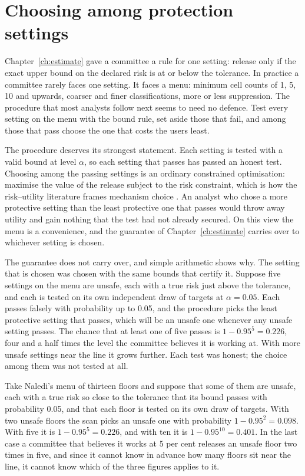 \chapter{Choosing among protection settings}\label{ch:selection}

Chapter~\ref{ch:estimate} gave a committee a rule for one setting: release only if the
exact upper bound on the declared risk is at or below the tolerance. In practice a
committee rarely faces one setting. It faces a menu: minimum cell counts of 1, 5, 10 and
upwards, coarser and finer classifications, more or less suppression. The procedure that
most analysts follow next seems to need no defence. Test every setting on the menu with
the bound rule, set aside those that fail, and among those that pass choose the one that
costs the users least.

The procedure deserves its strongest statement. Each setting is tested with a valid
bound at level $\alpha$, so each setting that passes has passed an honest test. Choosing
among the passing settings is an ordinary constrained optimisation: maximise the value of
the release subject to the risk constraint, which is how the risk--utility literature
frames mechanism choice \citep{duncan2001}. An analyst who chose a more protective
setting than the least protective one that passes would throw away utility and gain
nothing that the test had not already secured. On this view the menu is a convenience,
and the guarantee of Chapter~\ref{ch:estimate} carries over to whichever setting is
chosen.

The guarantee does not carry over, and simple arithmetic shows why. The setting that is
chosen was chosen with the same bounds that certify it. Suppose five settings on the menu
are unsafe, each with a true risk just above the tolerance, and each is tested on its own
independent draw of targets at $\alpha = 0.05$. Each passes falsely with probability up
to 0.05, and the procedure picks the least protective setting that passes, which will be
an unsafe one whenever any unsafe setting passes. The chance that at least one of five
passes is $1 - 0.95^5 = 0.226$, four and a half times the level the committee believes
it is working at.
With more unsafe settings near the line it grows further. Each test was honest; the
choice among them was not tested at all.

\begin{example}\label{c05:ex-menu}
Take Naledi's menu of thirteen floors and suppose that some of them are unsafe, each with
a true risk so close to the tolerance that its bound passes with probability 0.05, and
that each floor is tested on its own draw of targets. With two unsafe floors the scan
picks an unsafe one with probability $1 - 0.95^2 = 0.098$. With five it is
$1 - 0.95^5 = 0.226$, and with ten it is $1 - 0.95^{10} = 0.401$. In the last case a
committee that believes it works at 5 per cent releases an unsafe floor two times in
five, and since it cannot know in advance how many floors sit near the line, it cannot
know which of the three figures applies to it.
\end{example}

